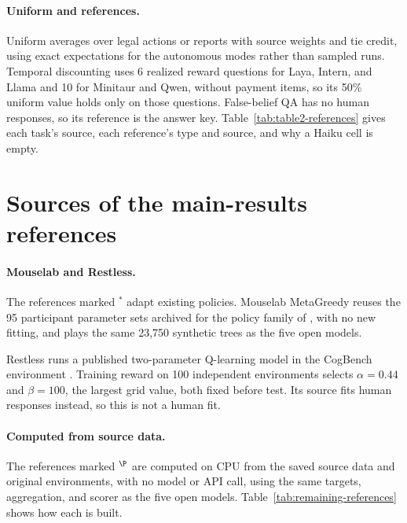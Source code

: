\documentclass[11pt,a4paper]{article}
\begin{document}
\paragraph{Uniform and references.}
Uniform averages over legal actions or reports with source weights and tie credit, using exact expectations for the autonomous modes rather than sampled runs. Temporal discounting uses 6 realized reward questions for Laya, Intern, and Llama and 10 for Minitaur and Qwen, without payment items, so its 50\% uniform value holds only on those questions. False-belief QA has no human responses, so its reference is the answer key. Table~\ref{tab:table2-references} gives each task's source, each reference's type and source, and why a Haiku cell is empty.

\section{Sources of the main-results references}
\label{app:reference-sources}\label{app:new-traditional-references}\label{app:remaining-references}\label{app:recovered-references}
\paragraph{Mouselab and Restless.}
The references marked $^\ast$ adapt existing policies. Mouselab MetaGreedy reuses the 95 participant parameter sets archived for the policy family of \citet{callaway2022planning}, with no new fitting, and plays the same 23,750 synthetic trees as the five open models.

Restless runs a published two-parameter Q-learning model in the CogBench environment \citep{codaforno2024cogbench}. Training reward on 100 independent environments selects $\alpha=0.44$ and $\beta=100$, the largest grid value, both fixed before test. Its source fits human responses instead, so this is not a human fit.

\paragraph{Computed from source data.}
The references marked $^\P$ are computed on CPU from the saved source data and original environments, with no model or API call, using the same targets, aggregation, and scorer as the five open models. Table~\ref{tab:remaining-references} shows how each is built.
\end{document}
